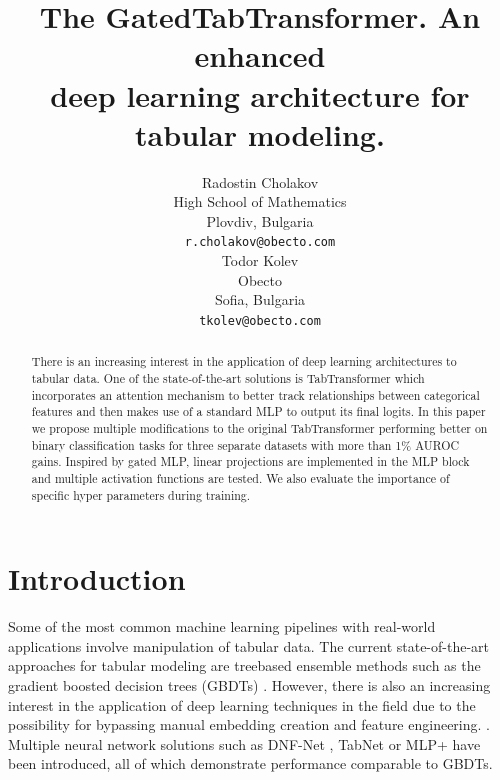 \documentclass{article}
\title{The GatedTabTransformer. An enhanced\\
deep learning architecture for tabular modeling.}
\author{
  Radostin Cholakov \\
  High School of Mathematics\\
  Plovdiv, Bulgaria\\
  \texttt{r.cholakov@obecto.com} \\
   \And
  Todor Kolev \\
  Obecto \\
  Sofia, Bulgaria \\
  \texttt{tkolev@obecto.com} \\
}
\begin{document}
\maketitle


\begin{abstract}
    There is an increasing interest in the application of deep learning architectures to tabular data. One of the state-of-the-art solutions is TabTransformer which incorporates an attention mechanism to better track relationships between categorical features and then makes use of a standard MLP to output its final logits. In this paper we propose multiple modifications to the original TabTransformer performing better on binary classification tasks for three separate datasets with more than 1\% AUROC gains. Inspired by gated MLP, linear projections are implemented in the MLP block and multiple activation functions are tested. We also evaluate the importance of specific hyper parameters during training.
\end{abstract}




\section{Introduction}

Some of the most common machine learning pipelines with real-world applications involve manipulation of tabular data. The current state-of-the-art approaches for tabular modeling are treebased ensemble methods such as the gradient boosted decision trees (GBDTs) \cite{chen2016xgboost}. However, there is also an increasing interest in the application of deep learning techniques in the field due to the possibility for bypassing manual embedding creation and feature engineering. \cite{fiedler2021simple}. Multiple neural network solutions such as DNF-Net \cite{abutbul2020dnf}, TabNet \cite{arik1908tabnet} or MLP+ \cite{fiedler2021simple} have been introduced, all of which demonstrate performance comparable to GBDTs.
\end{document}
